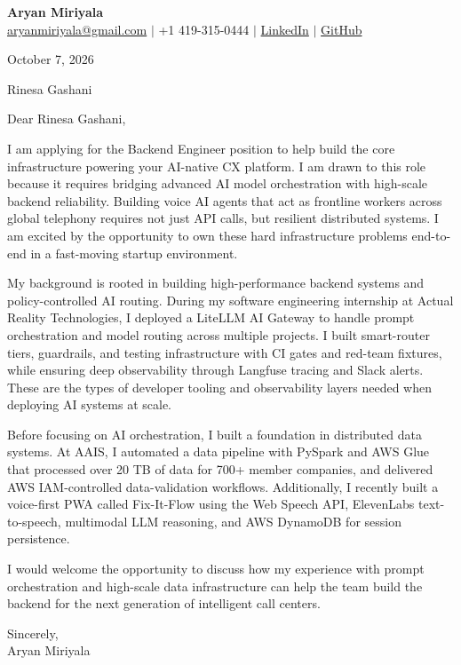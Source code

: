 \documentclass[letterpaper,11pt]{article}
\begin{document}
{\Large\textbf{Aryan Miriyala}}\\
\href{mailto:aryanmiriyala@gmail.com}{aryanmiriyala@gmail.com} $|$ +1 419-315-0444 $|$
\href{https://www.linkedin.com/in/aryan-miriyala-7788a21b6/}{LinkedIn} $|$
\href{https://github.com/aryanmiriyala}{GitHub}

October 7, 2026

Rinesa Gashani

Dear Rinesa Gashani,

I am applying for the Backend Engineer position to help build the core infrastructure powering your AI-native CX platform. I am drawn to this role because it requires bridging advanced AI model orchestration with high-scale backend reliability. Building voice AI agents that act as frontline workers across global telephony requires not just API calls, but resilient distributed systems. I am excited by the opportunity to own these hard infrastructure problems end-to-end in a fast-moving startup environment.

My background is rooted in building high-performance backend systems and policy-controlled AI routing. During my software engineering internship at Actual Reality Technologies, I deployed a LiteLLM AI Gateway to handle prompt orchestration and model routing across multiple projects. I built smart-router tiers, guardrails, and testing infrastructure with CI gates and red-team fixtures, while ensuring deep observability through Langfuse tracing and Slack alerts. These are the types of developer tooling and observability layers needed when deploying AI systems at scale. 

Before focusing on AI orchestration, I built a foundation in distributed data systems. At AAIS, I automated a data pipeline with PySpark and AWS Glue that processed over 20 TB of data for 700+ member companies, and delivered AWS IAM-controlled data-validation workflows. Additionally, I recently built a voice-first PWA called Fix-It-Flow using the Web Speech API, ElevenLabs text-to-speech, multimodal LLM reasoning, and AWS DynamoDB for session persistence. 

I would welcome the opportunity to discuss how my experience with prompt orchestration and high-scale data infrastructure can help the team build the backend for the next generation of intelligent call centers.

Sincerely,\\
Aryan Miriyala
\end{document}
